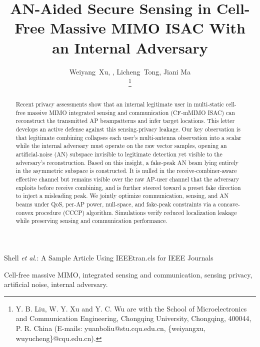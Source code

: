 \documentclass[lettersize,journal]{IEEEtran}
\begin{document}
\title{AN-Aided Secure Sensing in Cell-Free Massive MIMO ISAC With an Internal Adversary}

\author{Weiyang~Xu, , Licheng~Tong, Jiani Ma
   
	\thanks{Y. B. Liu, W. Y. Xu and Y. C. Wu are with the School of Microelectronics and Communication Engineering, Chongqing University, Chongqing, 400044, P. R. China (E-mails: yuanboliu@stu.cqu.edu.cn, \{weiyangxu, wuyucheng\}@cqu.edu.cn).}}

%
{Shell \MakeLowercase{\textit{et al.}}: A Sample Article Using IEEEtran.cls for IEEE Journals}


\maketitle

\begin{abstract}
Recent privacy assessments show that an internal legitimate user in multi-static cell-free massive MIMO integrated sensing and communication (CF-mMIMO ISAC) can reconstruct the transmitted AP beampatterns and infer target locations. This letter develops an active defense against this sensing-privacy leakage. Our key observation is that legitimate combining collapses each user's multi-antenna observation into a scalar while the internal adversary must operate on the raw vector samples, opening an artificial-noise (AN) subspace invisible to legitimate detection yet visible to the adversary's reconstruction. Based on this insight, a fake-peak AN beam lying entirely in the asymmetric subspace is constructed. It is nulled in the receive-combiner-aware effective channel but remains visible over the raw AP-user channel that the adversary exploits before receive combining, and is further steered toward a preset fake direction to inject a misleading peak. We jointly optimize communication, sensing, and AN beams under QoS, per-AP power, null-space, and fake-peak constraints via a concave-convex procedure (CCCP) algorithm. Simulations verify reduced localization leakage while preserving sensing and communication performance.
\end{abstract}

\begin{IEEEkeywords}
Cell-free massive MIMO, integrated sensing and communication, sensing privacy, artificial noise, internal adversary.
\end{IEEEkeywords}
\end{document}
